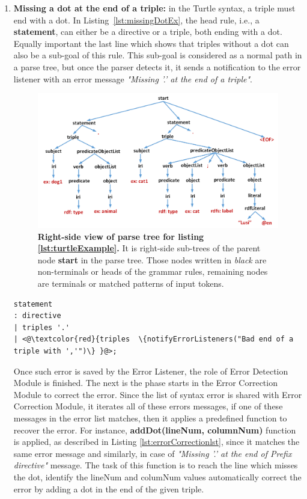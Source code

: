 \begin{enumerate}
    \item \textbf{Missing a dot at the end of a triple:} in the Turtle syntax, a triple must end with a dot. 
    In Listing~\ref{lst:missingDotEx}, the head rule, i.e., a \textbf{statement}, can either be a directive or a triple, both ending with a dot. 
    Equally important the last line which shows that triples without a dot can also be a sub-goal of this rule. 
    This sub-goal is considered as a normal path in a parse tree, but once the parser detects it, it sends a notification to the error listener with an error message \emph{"Missing ’.’ at the end of a triple"}.  
    \begin{figure}
		\includegraphics[width=1\linewidth]{images/implementationParseTreeRight.png}
	\caption{\textbf{Right-side view of parse tree  for listing \ref{lst:turtleExample}.} It is right-side sub-trees of the parent node \textbf{start} in the parse tree. Those nodes written in \emph{black} are non-terminals or heads of the grammar rules, remaining nodes are terminals or matched patterns of input tokens.}
	\label{Fig:implementationParseTreeRight}

\end{figure}
    
\begin{lstlisting}[label=lst:missingDotEx,  caption={The grammar rule for Detection of a syntax error for a missing dot at the end of a triple.}] 
statement
: directive
| triples '.'
| <@\textcolor{red}{triples  \{notifyErrorListeners("Bad end of a triple with ','")\} }@>;
\end{lstlisting}
Once such error is saved by the Error Listener, the role of Error Detection Module is finished. 
The next is the phase starts in the Error Correction Module to correct the error. 
Since the list of syntax error is shared with Error Correction Module, it iterates all of these errors messages, if one of these messages in the error list matches, then it applies a predefined function to recover the error.  
For instance, \textbf{addDot(lineNum, columnNum)} function is applied, as described in Listing \ref{lst:errorCorrectionlst}, since it matches the same error message and similarly, in case of \emph{"Missing  ’.’ at the end of Prefix directive"} message. 
The task of this function is to reach the line which misses the dot, identify the lineNum and columNum values automatically correct the error by adding a dot in the end of the given triple. 


\end{enumerate}
